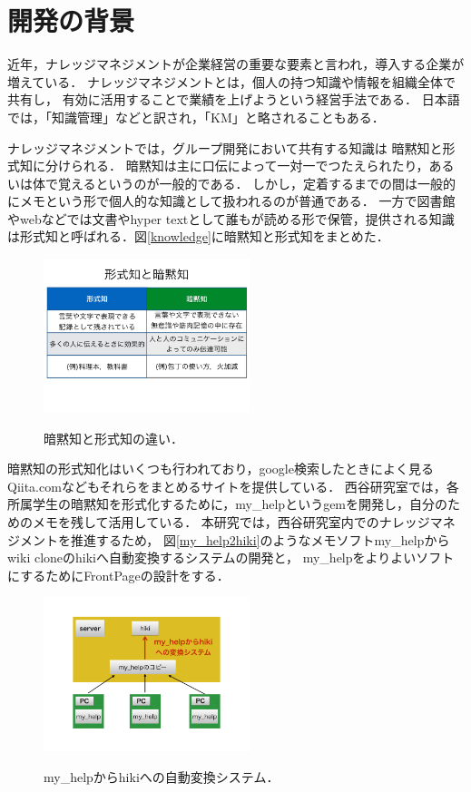 \section{開発の背景}
近年，ナレッジマネジメントが企業経営の重要な要素と言われ，導入する企業が増えている．
ナレッジマネジメントとは，個人の持つ知識や情報を組織全体で共有し，
有効に活用することで業績を上げようという経営手法である．
日本語では，「知識管理」などと訳され，「KM」と略されることもある\cite{a}．

ナレッジマネジメントでは，グループ開発において共有する知識は
暗黙知と形式知に分けられる\cite{b}．
暗黙知は主に口伝によって一対一でつたえられたり，あるいは体で覚えるというのが一般的である．
しかし，定着するまでの間は一般的にメモという形で個人的な知識として扱われるのが普通である．
一方で図書館やwebなどでは文書やhyper textとして誰もが読める形で保管，提供される知識は形式知と呼ばれる．図\ref{knowledge}に暗黙知と形式知をまとめた．


\begin{figure}[htbp]
\begin{center}
\includegraphics[width=6cm,bb=100 100 600 700]{my_help2hiki_saki.001.png}
\caption{暗黙知と形式知の違い．}
\label{knowledge}\label{default}\end{center}\end{figure}


暗黙知の形式知化はいくつも行われており，google検索したときによく見るQiita.comなどもそれらをまとめるサイトを提供している．
西谷研究室では，各所属学生の暗黙知を形式化するために，my\_helpというgemを開発し，自分のためのメモを残して活用している．
本研究では，西谷研究室内でのナレッジマネジメントを推進するため，
図\ref{my_help2hiki}のようなメモソフトmy\_helpからwiki cloneのhikiへ自動変換するシステムの開発と，
my\_helpをよりよいソフトにするためにFrontPageの設計をする．

\begin{figure}[htbp]
\begin{center}
\includegraphics[width=6cm,bb=100 100 600 700]{my_help2hiki_saki.011.png}
\caption{my\_helpからhikiへの自動変換システム．}
\label{my_help2hiki}\label{default}\end{center}\end{figure}

